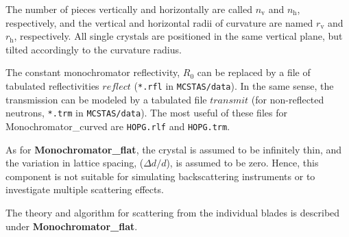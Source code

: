 The number of pieces vertically and horizontally are called
$n_\textrm{v}$ and $n_\textrm{h}$, respectively, and the vertical and horizontal
radii of curvature are named $r_\textrm{v}$ and $r_\textrm{h}$, respectively.
All single crystals are positioned in the same vertical plane,
but tilted accordingly to the curvature radius.

The constant monochromator reflectivity, $R_0$ can be replaced by
a file of tabulated reflectivities $reflect$ (\verb+*.rfl+ in \verb+MCSTAS/data+). In the same sense, the transmission
can be modeled by a tabulated file $transmit$ (for non-reflected neutrons, \verb+*.trm+ in \verb+MCSTAS/data+).
The most useful of these files for Monochromator\_curved are \verb+HOPG.rlf+ and \verb+HOPG.trm+.

As for \textbf{Monochromator\_flat}, the crystal is assumed to be infinitely
thin, and the variation in lattice spacing, ($\Delta d/d$),
is assumed to be zero. Hence, this
component is not suitable for simulating backscattering instruments or to
investigate multiple scattering effects.

The theory and algorithm for scattering from
the individual blades is described under \textbf{Monochromator\_flat}.
